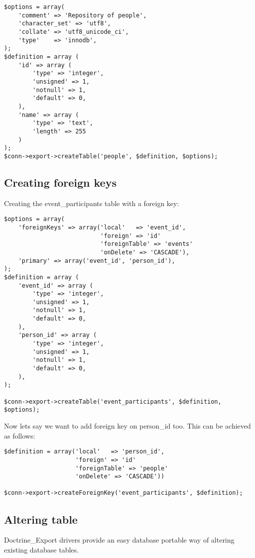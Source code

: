 \documentclass[11pt,a4paper]{report}
\begin{document}
\begin{verbatim}
$options = array(
    'comment' => 'Repository of people',
    'character_set' => 'utf8',
    'collate' => 'utf8_unicode_ci',
    'type'    => 'innodb',
);
$definition = array (
    'id' => array (
        'type' => 'integer',
        'unsigned' => 1,
        'notnull' => 1,
        'default' => 0,
    ),
    'name' => array (
        'type' => 'text',
        'length' => 255
    )
);
$conn->export->createTable('people', $definition, $options);
\end{verbatim}

\subsection{Creating foreign keys}
Creating the event\_participants table with a foreign key:

\begin{verbatim}
$options = array(
    'foreignKeys' => array('local'   => 'event_id',
                           'foreign' => 'id'
                           'foreignTable' => 'events'
                           'onDelete' => 'CASCADE'),
    'primary' => array('event_id', 'person_id'),
);
$definition = array (
    'event_id' => array (
        'type' => 'integer',
        'unsigned' => 1,
        'notnull' => 1,
        'default' => 0,
    ),
    'person_id' => array (
        'type' => 'integer',
        'unsigned' => 1,
        'notnull' => 1,
        'default' => 0,
    ),
);

$conn->export->createTable('event_participants', $definition, $options);
\end{verbatim}

Now lets say we want to add foreign key on person\_id too. This can be achieved as follows:

\begin{verbatim}
$definition = array('local'   => 'person_id',
                    'foreign' => 'id'
                    'foreignTable' => 'people'
                    'onDelete' => 'CASCADE'))

$conn->export->createForeignKey('event_participants', $definition);
\end{verbatim}

\subsection{Altering table}
Doctrine\_Export drivers provide an easy database portable way of altering existing database tables.
\end{document}
